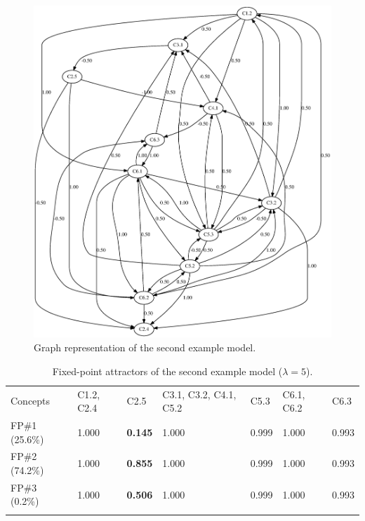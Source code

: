 \documentclass[graybox]{svmult}
\begin{document}
\begin{figure}
  \includegraphics[width=\textwidth]{BP2Spartial.eps}
  \caption{Graph representation of the second example model.}
  \label{fig:BP2Spartial}
\end{figure}

\begin{table}
\caption{Fixed-point attractors of the second example model ($\lambda = 5$).}
\label{tab:BP2Spartial5-FPs}
\begin{center}
\begin{tabular}{lllllll}
\hline\noalign{\smallskip}
Concepts & C1.2, C2.4 & C2.5 & C3.1, C3.2, C4.1, C5.2 & C5.3 & C6.1, C6.2 & C6.3\\
\noalign{\smallskip}\svhline\noalign{\smallskip}
FP\#1 (25.6\%)& 1.000 & \textbf{0.145} & 1.000 & 0.999 & 1.000 & 0.993\\
FP\#2 (74.2\%) & 1.000 & \textbf{0.855} & 1.000 & 0.999 & 1.000 & 0.993\\
FP\#3 (0.2\%) & 1.000 & \textbf{0.506} & 1.000 & 0.999 & 1.000 & 0.993\\
\noalign{\smallskip}\hline
\end{tabular}
\end{center}
\end{table}
\end{document}

